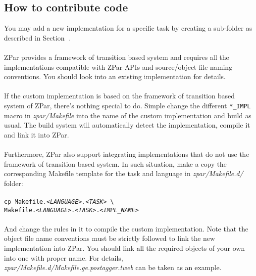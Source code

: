 \documentclass[12pt]{article}
\begin{document}
\begin{CJK}{GBK}{song}
\section{How to contribute code}
\label{sec:customizing-zpar}

You may add a new implementation for a specific task
by creating a sub-folder as described in Section~.
\\
\\
ZPar provides a framework of transition based system
and requires all the implementations compatible with
ZPar APIs and source/object file naming conventions.
You should look into an existing implementation for details.
\\
\\
If the custom implementation is based on the framework
of transition based system of ZPar, 
there's nothing special to do.
Simple change the different \texttt{*\_IMPL} macro in \textit{zpar/Makefile}
into the name of the custom implementation and build as usual.
The build system will automatically detect the implementation,
compile it and link it into ZPar.
\\
\\
Furthermore, ZPar also support integrating implementations
that do not use the framework of transition based system.
In such situation, make a copy the corresponding Makefile template
for the task and language 
in \textit{zpar/Makefile.d/} folder:
\\
\\
\hspace{3cm}\texttt{cp Makefile.\textit{<LANGUAGE>}.\textit{<TASK>} \textbackslash \\
\hspace{3cm}\quad Makefile.\textit{<LANGUAGE>}.\textit{<TASK>}.\textit{<IMPL_NAME>}}
\\
\\
And change the rules in it to compile the custom implementation.
Note that the object file name conventions must be strictly followed
to link the new implementation into ZPar.
You should link all the required objects of your own into one with proper name.
For details, \textit{zpar/Makefile.d/Makefile.ge.postagger.tweb} can be taken as an example.

\end{CJK}
\end{document}
